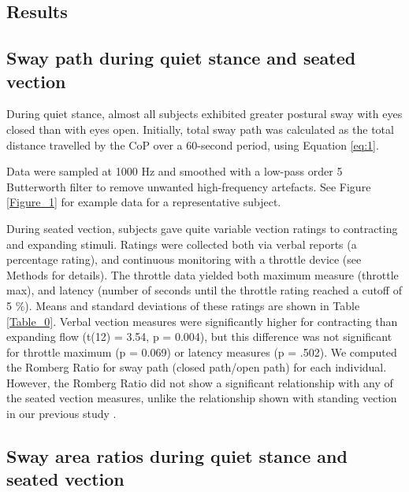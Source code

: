 \documentclass[11pt]{article}
\begin{document}
\begin{linenumbers}



\section*{Results}
 
\subsection*{Sway path during quiet stance and seated vection}
During quiet stance, almost all subjects exhibited greater postural sway with eyes closed than with eyes open. Initially, total sway path was calculated as the total distance travelled by the CoP over a 60-second period, using Equation \ref{eq:1}.

 Data were sampled at 1000 Hz and smoothed with a low-pass order 5 Butterworth filter to remove unwanted high-frequency artefacts. See Figure \ref{Figure_1} for example data for a representative subject. 

During seated vection, subjects gave quite variable vection ratings to contracting and expanding stimuli. Ratings were collected both via verbal reports (a percentage rating), and continuous monitoring with a throttle device (see Methods for details). The throttle data yielded both maximum measure (throttle max), and latency (number of seconds until the throttle rating reached a cutoff of 5 \%). Means and standard deviations of these ratings are shown in Table \ref{Table_0}. Verbal vection measures were significantly higher for contracting than expanding flow (t(12) = 3.54, p = 0.004), but this difference was not significant for throttle maximum (p = 0.069) or latency measures (p = .502). We computed the Romberg Ratio for sway path (closed path/open path) for each individual. However, the Romberg Ratio did not show a significant relationship with any of the seated vection measures, unlike the relationship shown with standing vection in our previous study \cite{Palmisano:2014ez}.


\subsection*{Sway area ratios during quiet stance and seated vection}


\end{linenumbers}
\end{document}
